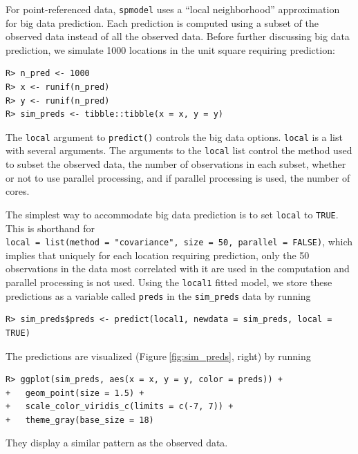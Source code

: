 \documentclass{article}
\begin{document}
For point-referenced data, \texttt{spmodel} uses a ``local
neighborhood'' approximation for big data prediction. Each prediction is
computed using a subset of the observed data instead of all the observed
data. Before further discussing big data prediction, we simulate 1000
locations in the unit square requiring prediction:

\begin{verbatim}
R> n_pred <- 1000
R> x <- runif(n_pred)
R> y <- runif(n_pred)
R> sim_preds <- tibble::tibble(x = x, y = y)
\end{verbatim}

The \texttt{local} argument to \texttt{predict()} controls the big data
options. \texttt{local} is a list with several arguments. The arguments
to the \texttt{local} list control the method used to subset the
observed data, the number of observations in each subset, whether or not
to use parallel processing, and if parallel processing is used, the
number of cores.

The simplest way to accommodate big data prediction is to set
\texttt{local} to \texttt{TRUE}. This is shorthand for
\texttt{local\ =\ list(method\ =\ "covariance",\ size\ =\ 50,\ parallel\ =\ FALSE)},
which implies that uniquely for each location requiring prediction, only
the 50 observations in the data most correlated with it are used in the
computation and parallel processing is not used. Using the
\texttt{local1} fitted model, we store these predictions as a variable
called \texttt{preds} in the \texttt{sim\_preds} data by running

\begin{verbatim}
R> sim_preds$preds <- predict(local1, newdata = sim_preds, local = TRUE)
\end{verbatim}

The predictions are visualized (Figure\(~\)\ref{fig:sim_preds}, right)
by running

\begin{verbatim}
R> ggplot(sim_preds, aes(x = x, y = y, color = preds)) +
+   geom_point(size = 1.5) +
+   scale_color_viridis_c(limits = c(-7, 7)) + 
+   theme_gray(base_size = 18)
\end{verbatim}

They display a similar pattern as the observed data.
\end{document}
